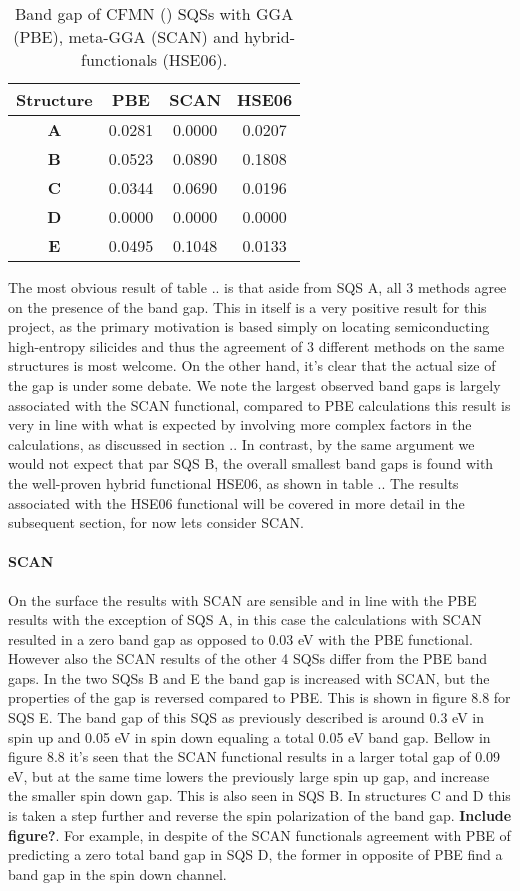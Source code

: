 \begin{table}[H]
\centering
\begin{tabular}{@{}cccc@{}}
\toprule
Structure  & PBE    & SCAN   & HSE06  \\ \midrule
\textbf{A} & 0.0281 & 0.0000 & 0.0207 \\
\textbf{B} & 0.0523 & 0.0890 & 0.1808 \\
\textbf{C} & 0.0344 & 0.0690 & 0.0196 \\
\textbf{D} & 0.0000 & 0.0000 & 0.0000 \\
\textbf{E} & 0.0495 & 0.1048 & 0.0133 \\ \bottomrule
\end{tabular}
\caption{Band gap of CFMN () SQSs with GGA (PBE), meta-GGA (SCAN) and hybrid-functionals (HSE06).}
\end{table}

The most obvious result of table .. is that aside from SQS A, all 3 methods agree on the presence of the band gap. This in itself is a very positive result for this project, as the primary motivation is based simply on locating semiconducting high-entropy silicides and thus the agreement of 3 different methods on the same structures is most welcome. On the other hand, it's clear that the actual size of the gap is under some debate. We note the largest observed band gaps is largely associated with the SCAN functional, compared to PBE calculations this result is very in line with what is expected by involving more complex factors in the calculations, as discussed in section .. In contrast, by the same argument we would not expect that par SQS B, the overall smallest band gaps is found with the well-proven hybrid functional HSE06, as shown in table .. The results associated with the HSE06 functional will be covered in more detail in the subsequent section, for now lets consider SCAN. 
 
\paragraph{SCAN \\}
On the surface the results with SCAN are sensible and in line with the PBE results with the exception of SQS A, in this case the calculations with SCAN resulted in a zero band gap as opposed to 0.03 eV with the PBE functional. However also the SCAN results of the other 4 SQSs differ from the PBE band gaps. In the two SQSs B and E the band gap is increased with SCAN, but the properties of the gap is reversed compared to PBE. This is shown in figure 8.8 for SQS E. The band gap of this SQS as previously described is around 0.3 eV in spin up and 0.05 eV in spin down equaling a total 0.05 eV band gap. Bellow in figure 8.8 it's seen that the SCAN functional results in a larger total gap of 0.09 eV, but at the same time lowers the previously large spin up gap, and increase the smaller spin down gap. This is also seen in SQS B. In structures C and D this is taken a step further and reverse the spin polarization of the band gap. \textbf{Include figure?}. For example, in despite of the SCAN functionals agreement with PBE of predicting a zero total band gap in SQS D, the former in opposite of PBE find a band gap in the spin down channel.  
 
